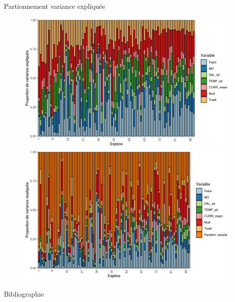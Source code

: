\documentclass[%
]{beamer}
\begin{document}
	\begin{frame}{Partionnement variance expliquée}
		\begin{figure}[t]
		\begin{center}
			\includegraphics[scale =0.38]{figs/VP-HMSC-Var-Part-plot-1.png}%
			\includegraphics[scale =0.38]{figs/VP-HMSC-Var-Part-plot-2.png}%
		\end{center}
	\end{figure}
	\end{frame}
	
	
	\begin{frame}[allowframebreaks]{Bibliographie}
		\begin{tiny}
			
		\end{tiny}
	\end{frame}
\end{document}
